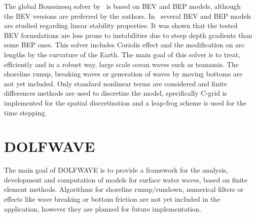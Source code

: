 The global Boussinesq solver by~\citet{PedersenLovholt2008}
is based on BEV and BEP models, although the BEV versions
are preferred by the authors.  In~\citet{LovholtPedersen2009}
several BEV and BEP models are
studied regarding linear stability properties.  It was shown
that the tested BEV formulations are less prone to
instabilities due to steep depth gradients than some BEP
ones.  This solver includes Coriolis effect and the
modification on arc lengths by the curvature of the
Earth. The main goal of this solver is to treat, efficiently
and in a robust way, large scale ocean waves such as
tsunamis.  The shoreline runup, breaking waves or generation
of waves by moving bottoms are not yet included.  Only
standard nonlinear terms are considered and finite
differences methods are used to discretize the model,
specifically C-grid is implemented for the spatial discretization and a
leap-frog scheme is used for the time stepping.

\section{DOLFWAVE}\label{sec:lopes:dolfwave}
The main goal of DOLFWAVE is to provide a framework for the
analysis, development and computation of models for surface
water waves, based on finite element methods. Algorithms
for shoreline runup/rundown, numerical filters or effects
like wave breaking or bottom friction are not yet included
in the application, however they are planned for future
implementation.

